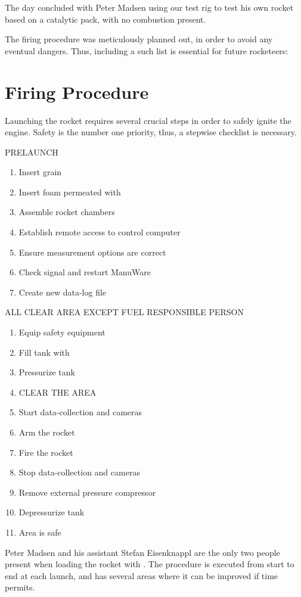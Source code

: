 		The day concluded with Peter Madsen using our test rig to test his own rocket based on a catalytic pack, with no combustion present.

		The firing procedure was meticulously planned out, in order to avoid any eventual dangers. Thus, including a such list is essential for future rocketeers:

\section{Firing Procedure}
	Launching the rocket requires several crucial steps in order to safely ignite the engine. Safety is the number one priority, thus, a stepwise checklist is necessary.

PRELAUNCH
\begin{enumerate}
  \itemsep0em
  \item Insert grain
  \item Insert foam permeated with 
  \item Assemble rocket chambers
  \item Establish remote access to control computer
  \item Ensure measurement options are correct
  \item Check signal and restart ManuWare
  \item Create new data-log file
\end{enumerate}
ALL CLEAR AREA EXCEPT FUEL RESPONSIBLE PERSON
\begin{enumerate}
  \itemsep0em
  \item Equip  safety equipment
  \item Fill tank with 
  \item Pressurize tank
  \item CLEAR THE AREA
  \item Start data-collection and cameras
  \item Arm the rocket
  \item Fire the rocket
  \item Stop data-collection and cameras
  \item Remove external pressure compressor
  \item Depressurize tank
  \item Area is safe
\end{enumerate}

	Peter Madsen and his assistant Stefan Eisenknappl are the only two people present when loading the rocket with . The procedure is executed from start to end at each launch, and has several areas where it can be improved if time permits.
